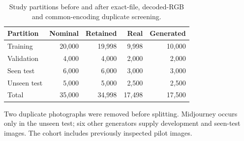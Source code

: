 \begin{table}[!htbp]\centering\resulttable
\caption{Study partitions before and after exact-file, decoded-RGB and common-encoding duplicate screening.}\label{tab:dataset}
\begin{tabularx}{\linewidth}{@{}Yrrrr@{}}\toprule
Partition & Nominal & Retained & Real & Generated\\\midrule
Training & 20,000 & 19,998 & 9,998 & 10,000\\
Validation & 4,000 & 4,000 & 2,000 & 2,000\\
Seen test & 6,000 & 6,000 & 3,000 & 3,000\\
Unseen test & 5,000 & 5,000 & 2,500 & 2,500\\
Total & 35,000 & 34,998 & 17,498 & 17,500\\
\bottomrule\end{tabularx}
\par\smallskip\parbox{\linewidth}{\footnotesize Two duplicate photographs were removed before splitting. Midjourney occurs only in the unseen test; six other generators supply development and seen-test images. The cohort includes previously inspected pilot images.}
\end{table}
